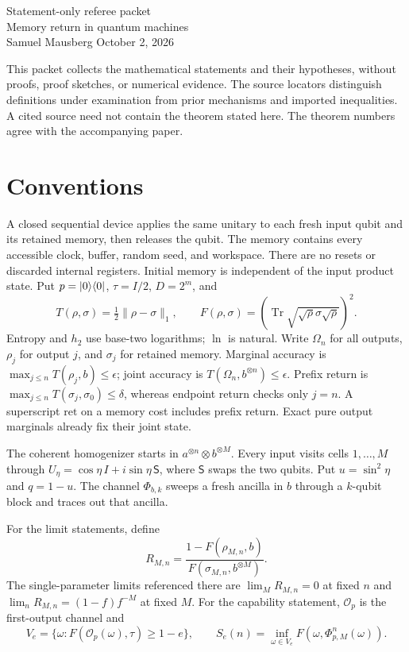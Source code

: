 \documentclass[11pt]{article}
\begin{document}
\begin{center}
{\Large Statement-only referee packet}\\[5pt]
{\large Memory return in quantum machines}\\[5pt]
Samuel Mausberg \qquad October 2, 2026
\end{center}

This packet collects the mathematical statements and their hypotheses, without proofs, proof sketches, or numerical evidence. The source locators distinguish definitions under examination from prior mechanisms and imported inequalities. A cited source need not contain the theorem stated here. The theorem numbers agree with the accompanying paper.

\section*{Conventions}
A closed sequential device applies the same unitary to each fresh input qubit and its retained memory, then releases the qubit. The memory contains every accessible clock, buffer, random seed, and workspace. There are no resets or discarded internal registers. Initial memory is independent of the input product state. Put $p=|0\rangle\langle0|$, $\tau=I/2$, $D=2^m$, and
\[
T(\rho,\sigma)=\tfrac12\|\rho-\sigma\|_1,
\qquad F(\rho,\sigma)=\left(\operatorname{Tr}\sqrt{\sqrt\rho\sigma\sqrt\rho}\right)^2.
\]
Entropy and $h_2$ use base-two logarithms; $\ln$ is natural. Write $\Omega_n$ for all outputs, $\rho_j$ for output $j$, and $\sigma_j$ for retained memory. Marginal accuracy is $\max_{j\le n}T(\rho_j,b)\le\epsilon$; joint accuracy is $T(\Omega_n,b^{\otimes n})\le\epsilon$. Prefix return is $\max_{j\le n}T(\sigma_j,\sigma_0)\le\delta$, whereas endpoint return checks only $j=n$. A superscript $\mathrm{ret}$ on a memory cost includes prefix return. Exact pure output marginals already fix their joint state.

The coherent homogenizer starts in $a^{\otimes n}\otimes b^{\otimes M}$. Every input visits cells $1,\ldots,M$ through $U_\eta=\cos\eta\,I+i\sin\eta\,\mathsf S$, where $\mathsf S$ swaps the two qubits. Put $u=\sin^2\eta$ and $q=1-u$. The channel $\Phi_{b,k}$ sweeps a fresh ancilla in $b$ through a $k$-qubit block and traces out that ancilla.

For the limit statements, define
\[
 R_{M,n}=\frac{1-F(\rho_{M,n},b)}{F(\sigma_{M,n},b^{\otimes M})}.
\]
The single-parameter limits referenced there are $\lim_M R_{M,n}=0$ at fixed $n$ and $\lim_n R_{M,n}=(1-f)f^{-M}$ at fixed $M$. For the capability statement, $\mathcal O_p$ is the first-output channel and
\[
V_e=\{\omega:F(\mathcal O_p(\omega),\tau)\ge1-e\},\qquad
S_e(n)=\inf_{\omega\in V_e}F(\omega,\Phi_{p,M}^{n}(\omega)).
\]
\end{document}
